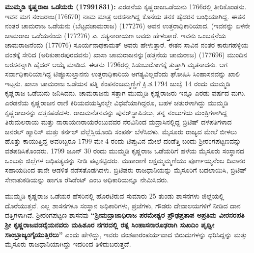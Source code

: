 \textbf{ ಮುಮ್ಮಡಿ ಕೃಷ್ಣರಾಜ ಒಡೆಯರು (17991831): } ಎರಡನೆಯ ಕೃಷ್ಣರಾಜಒಡೆಯನು 1766ರಲ್ಲಿ ತೀರಿಕೊಂಡನು. ಇವನ ಮಗ ನಂಜರಾಜ(176670) ನಾಮ ಮಾತ್ರ ಅರಸನಾಗಿದ್ದ ಕೊನೆಯ ತನಕ ಹೈದರನ ಬಂಧಿಯಾಗಿದ್ದ. ಈತನ ನಂತರ ಚಾಮರಾಜ ಒಡೆಯನು (ಬೆಟ್ಟದಚಾಮರಾಜ) (177276) ಅವನ ಉತ್ತರಾಧಿಕಾರಿಯಾದ. (ಇವನನ್ನು ಏಳನೇ ಚಾಮರಾಜ ಒಡೆಯನೆಂದು (177276) ಎ. ಸತ್ಯನಾರಾಯಣ ಅವರು ಹೇಳುತ್ತಾರೆ. ಇವನು ಒಂಬತ್ತನೆಯ ಚಾಮರಾಜನೆಂದು (177076) ಸೂರ್ಯನಾಥಕಾಮತ್​ ಅವರು ಹೇಳುತ್ತಾರೆ. ಈತನ ಸಾವಿನ ನಂತರ ಕಾರುಗಹಳ್ಳಿಯ ವಂಶಕ್ಕೆ ಸೇರಿದ (ಅರಿಕುಠಾರಪುರದವನು) ಖಾಸಾ ಚಾಮರಾಜನನ್ನು(ಹತ್ತನೆಯ ಚಾಮರಾಜ) (177696) ಮುಂದಿನ ಅರಸನನ್ನಾಗಿ ಹೈದರ್​ ಆಯ್ಕೆ ಮಾಡಿದ. ಈತನು 1796ರಲ್ಲಿ ಸಿಡುಬುರೋಗಕ್ಕೆ ತುತ್ತಾಗಿ ಮೃತನಾದನು. ಆಗ ಸರ್ವಾಧಿಕಾರಿಯಾಗಿದ್ದ ಟಿಪ್ಪೂಸುಲ್ತಾನನು ಉತ್ತರಾಧಿಕಾರಿಯ ಅಗತ್ಯವಿಲ್ಲವೆಂದು ಘೋಷಿಸಿ ಸಿಂಹಾಸನವನ್ನು ಖಾಲಿ ಇಟ್ಟನು. ಖಾಸಾ ಚಾಮರಾಜ ಒಡೆಯನ ಪತ್ನಿ ಕೆಂಪನಂಜಮ್ಮಣ್ಣಿಗೆ ಕ್ರಿ.ಶ.1794 ಜುಲೈ 14 ರಂದು ಮುಮ್ಮಡಿ ಕೃಷ್ಣರಾಜ ಒಡೆಯನು ಜನಿಸಿದನು. ಚಾಮರಾಜನು ಸತ್ತಾಗ ಮುಮ್ಮಡಿ ಕೃಷ್ಣರಾಜರು ಇನ್ನೂ ಎರಡು ವರ್ಷದ ಮಗು. ಎರಡನೆಯ ಕೃಷ್ಣರಾಜನ ರಾಣಿ ಕಿರಿಯವಯಸ್ಸಿನಲ್ಲೇ ವಿಧವೆಯಾಗಿದ್ದರೂ, ಬಹಳ ಚತುರಳಾಗಿದ್ದು ಮುಮ್ಮಡಿ ಕೃಷ್ಣರಾಜನನ್ನು ದತ್ತಕಪಡೆದಳು. ರಾಜಮನೆತನವನ್ನು ಪುನರ್​ ಸ್ಥಾಪಿಸಲು, ತನ್ನ ನಂಬುಗೆಯ ಮಂತ್ರಿಗಳಾಗಿದ್ದ ತಿರುಮಲರಾಯ ಮತ್ತು ನಾರಾಯಣರಾಯರೆಂಬುವವರ ನೆರವಿನಿಂದ ಮದ್ರಾಸಿನಲ್ಲಿದ್ದ ಬ್ರಿಟಿಷ್​ ದಳಪತಿಗಳಾದ ಜನರಲ್​ ಹ್ಯಾರಿಸ್​ ಮತ್ತು ಕರ್ನಲ್​ ವೆಲ್ಲೆಸ್ಲಿಯೊಂದಿ ಸಂಪರ್ಕ ಬೆಳೆಸಿದಳು. ಮೈಸೂರು ರಾಜ್ಯದ ಮೇಲೆ ಬೀಳಲು ಹೊತ್ತು ಕಾಯುತ್ತಿದ್ದ ಅವರಿಬ್ಬರೂ 1799 ಮೇ 4 ರಂದು ಟಿಪ್ಪುವಿನ ಮೇಲೆ ದಂಡೆತ್ತಿ ಬಂದು ಶ‍್ರೀರಂಗಪಟ್ಟಣವನ್ನು ವಶಪಡಿಸಿಕೊಂಡರು. 1799 ಜೂನ್​ 30 ರಂದು ಮುಮ್ಮಡಿ ಕೃಷ್ಣರಾಜ ಒಡೆಯರಿಗೆ ಹಳೆಯ ಮೈಸೂರು ಸಂಸ್ಥಾನದ ಒಂಬತ್ತು ಜಿಲ್ಲೆಗಳ ಆಧಿಪತ್ಯವನ್ನು ನೀಡಿ ಪಟ್ಟಕಟ್ಟಿದರು. ಮಹಾರಾಣಿ ಲಕ್ಷಮ್ಮಮ್ಮಣಿಯು ಪೂರ್ಣಯ್ಯನೆಂಬ ದಿವಾನರ ಸಹಾಯದಿಂದ ತಾನೇ ಆಡಳಿತ ನಡೆಸತೊಡಗಿದಳು. ಬ್ರಿಟಿಷರು ರಾಜಧಾನಿಯನ್ನು ಮೈಸೂರಿಗೆ ಬದಲಾಯಿಸಿ, ಬ್ರಿಟಿಷ್​ ಸೇನಾತುಕಡಿಯನ್ನು ಹಾಗೂ ರೆಸಿಡೆಂಟ್​ ಎಂಬ ಅಧಿಕಾರಿಯನ್ನೂ ನೇಮಿಸಿದರು.

ಮುಮ್ಮಡಿ ಕೃಷ್ಣರಾಜ ಒಡೆಯರ ಹೆಸರಿನಲ್ಲಿ ಹೊರಟಿರುವ ಸುಮಾರು 25 ತುಂಡು ಶಾಸನಗಳು ಜಿಲ್ಲೆಯಲ್ಲಿ ದೊರೆಯುತ್ತವೆ. ಎಲ್ಲ ಶಾಸನಗಳೂ ಸಂಸ್ಥಾನ ಅಧಿಕಾರಿಗಳು, ಪ್ರಜೆಗಳು, ಗೌಡರು ದೇವಾಲಯಗಳಿಗೆ ನೀಡಿದ ದಾನ ದತ್ತಿಗಳಾಗಿವೆ. ಶ‍್ರೀರಂಗಪಟ್ಟಣ ಶಾಸನವು\textbf{ “ಶ‍್ರೀಮದ್ರಾಜಾಧಿರಾಜ ಪರಮೇಶ್ವರ ಪ್ರೌಢಪ್ರತಾಪ ಅಪ್ರತಿಮ ವೀರನರಪತಿ ಶ‍್ರೀ ಕೃಷ್ಣರಾಜವಡರೈಯ\-ನವರು ಮಹಿಶೂರ ನಗರದಲ್ಲಿ ರತ್ನ ಸಿಂಹಾಸನಾರೂಢರಾಗಿ ಸುಖದಿಂ ಪೃಥ್ವೀ ಸಾಂಬ್ರಾಜ್ಯಂಗೈಯುತ್ತಿರಲು” }ಎಂದು ಹೇಳಿದ್ದು, ಇವರು ವಂಶಪಾರಂಪರ್ಯವಾದ ಬಿರುದುಗಳನ್ನು ಧರಿಸಿದ್ದನ್ನು ಮತ್ತು ಮೈಸೂರು ರಾಜಧಾನಿಯಾಗಿದ್ದು ಇದರಿಂದ ತಿಳಿದು\-ಬರುತ್ತದೆೆ.

